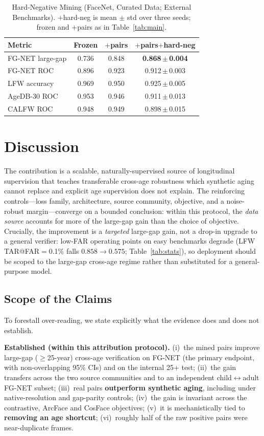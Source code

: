 \documentclass[journal]{IEEEtran}
\begin{document}
\begin{table}[!t]
\renewcommand{\arraystretch}{1.2}
\caption{Hard-Negative Mining (FaceNet, Curated Data; External Benchmarks). $+$hard-neg is mean $\pm$ std over three seeds; frozen and $+$pairs as in Table~\ref{tab:main}.}
\label{tab:hardneg}
\centering
\footnotesize
\begin{tabular}{@{}lccc@{}}
\toprule
Metric & Frozen & $+$pairs & $+$pairs$+$hard-neg \\
\midrule
FG-NET large-gap & 0.736 & 0.848 & \textbf{0.868\,$\pm$\,0.004} \\
FG-NET ROC & 0.896 & 0.923 & 0.912\,$\pm$\,0.003 \\
LFW accuracy & 0.969 & 0.950 & 0.925\,$\pm$\,0.005 \\
AgeDB-30 ROC & 0.953 & 0.946 & 0.911\,$\pm$\,0.013 \\
CALFW ROC & 0.948 & 0.949 & 0.898\,$\pm$\,0.015 \\
\bottomrule
\end{tabular}
\end{table}

\section{Discussion}\label{sec:discussion}
The contribution is a scalable, naturally-supervised source of longitudinal supervision that teaches transferable cross-age robustness which synthetic aging cannot replace and explicit age supervision does not explain. The reinforcing controls---loss family, architecture, source community, objective, and a noise-robust margin---converge on a bounded conclusion: within this protocol, the \emph{data source} accounts for more of the large-gap gain than the choice of objective. Crucially, the improvement is a \emph{targeted} large-gap gain, not a drop-in upgrade to a general verifier: low-FAR operating points on easy benchmarks degrade (LFW TAR@FAR$=$0.1\% falls $0.858 \rightarrow 0.575$; Table~\ref{tab:stats}), so deployment should be scoped to the large-gap cross-age regime rather than substituted for a general-purpose model.

\subsection{Scope of the Claims}\label{sec:scope}
To forestall over-reading, we state explicitly what the evidence does and does not establish.

\noindent\textbf{Established (within this attribution protocol).} (i)~the mined pairs improve large-gap ($\geq$25-year) cross-age verification on FG-NET (the primary endpoint, with non-overlapping 95\% CIs) and on the internal 25+ test; (ii)~the gain transfers across the two source communities and to an independent child$\leftrightarrow$adult FG-NET subset; (iii)~real pairs \textbf{outperform synthetic aging}, including under native-resolution and gap-parity controls; (iv)~the gain is invariant across the contrastive, ArcFace and CosFace objectives; (v)~it is mechanistically tied to \textbf{removing an age shortcut}; (vi)~roughly half of the raw positive pairs were near-duplicate frames.
\end{document}
